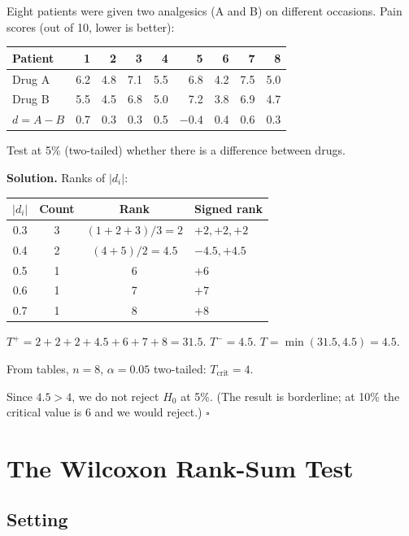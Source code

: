 \documentclass[12pt, a4paper, oneside]{book}
\theoremstyle{definition}
\theoremstyle{plain}
\theoremstyle{remark}
\newenvironment{solution}
  {\par\medskip\noindent\textbf{Solution.}\quad}
  {\hfill$\square$\par\medskip}
\begin{document}
\begin{workedexample}
Eight patients were given two analgesics (A and B) on different occasions.
Pain scores (out of 10, lower is better):
\begin{center}
\begin{tabular}{lrrrrrrrr}
\toprule
Patient & 1 & 2 & 3 & 4 & 5 & 6 & 7 & 8 \\
\midrule
Drug A & 6.2 & 4.8 & 7.1 & 5.5 & 6.8 & 4.2 & 7.5 & 5.0 \\
Drug B & 5.5 & 4.5 & 6.8 & 5.0 & 7.2 & 3.8 & 6.9 & 4.7 \\
$d=A-B$ & 0.7 & 0.3 & 0.3 & 0.5 & $-0.4$ & 0.4 & 0.6 & 0.3 \\
\bottomrule
\end{tabular}
\end{center}
Test at 5\% (two-tailed) whether there is a difference between drugs.

\begin{solution}
Ranks of $|d_i|$:
\begin{center}
\begin{tabular}{cccl}
\toprule
$|d_i|$ & Count & Rank & Signed rank \\
\midrule
0.3 & 3 & $(1+2+3)/3=2$ & $+2,+2,+2$ \\
0.4 & 2 & $(4+5)/2=4.5$ & $-4.5,+4.5$ \\
0.5 & 1 & 6 & $+6$ \\
0.6 & 1 & 7 & $+7$ \\
0.7 & 1 & 8 & $+8$ \\
\bottomrule
\end{tabular}
\end{center}

$T^+ = 2+2+2+4.5+6+7+8 = 31.5$.
$T^- = 4.5$.
$T = \min(31.5, 4.5) = 4.5$.

From tables, $n=8$, $\alpha=0.05$ two-tailed: $T_{\text{crit}}=4$.

Since $4.5 > 4$, we do not reject $H_0$ at 5\%.
(The result is borderline; at 10\% the critical value is 6 and we would
reject.)
\end{solution}
\end{workedexample}

\section{The Wilcoxon Rank-Sum Test}
\label{sec:rank-sum}

\subsection{Setting}
\end{document}
